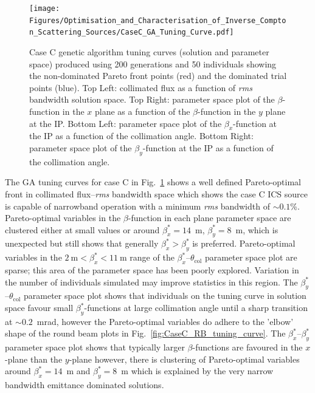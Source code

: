 \documentclass[../main.tex]{subfiles}
\begin{document}
\begin{figure}[!h]
\centering
\texttt{[image: Figures/Optimisation\_and\_Characterisation\_of\_Inverse\_Compton\_Scattering\_Sources/CaseC\_GA\_Tuning\_Curve.pdf]}
\caption{Case C genetic algorithm tuning curves (solution and parameter space) produced using 200 generations and 50 individuals showing the non-dominated Pareto front points (red) and the dominated trial points (blue). Top Left: collimated flux as a function of \textit{rms} bandwidth solution space. Top Right: parameter space plot of the $\beta$-function in the $x$ plane as a function of the $\beta$-function in the $y$ plane at the IP. Bottom Left: parameter space plot of the $\beta_{x}$-function at the IP as a function of the collimation angle. Bottom Right: parameter space plot of the $\beta_{y}$-function at the IP as a function of the collimation angle.}
\label{fig:case_C_GA_tuning_curves}
\end{figure}

The GA tuning curves for case C in Fig.~\ref{fig:case_C_GA_tuning_curves} shows a well defined Pareto-optimal front in collimated flux--\textit{rms} bandwidth space which shows the case C ICS source is capable of narrowband operation with a minimum \textit{rms} bandwidth of $\sim0.1$\%. Pareto-optimal variables in the $\beta$-function in each plane parameter space are clustered either at small values or around $\beta_{x}^{*} = 14$~\si{\meter}, $\beta_{y}^{*} = 8$~\si{\meter}, which is unexpected but still shows that generally $\beta_{x}^{*}>\beta_{y}^{*}$ is preferred. Pareto-optimal variables in the $2\mathrm{~\si{\meter}} < \beta_{x}^{*} < 11\mathrm{~\si{\meter}}$ range of the $\beta_{x}^{*}$--$\theta_{\mathrm{col}}$ parameter space plot are sparse; this area of the parameter space has been poorly explored. Variation in the number of individuals simulated may improve statistics in this region. The $\beta_{y}^{*}$--$\theta_{\mathrm{col}}$ parameter space plot shows that individuals on the tuning curve in solution space favour small $\beta_{y}^{*}$-functions at large collimation angle until a sharp transition at $\sim0.2$~\si{\milli\radian}, however the Pareto-optimal variables do adhere to the 'elbow' shape of the round beam plots in Fig.~\ref{fig:CaseC_RB_tuning_curve}. The $\beta_{x}^{*}$--$\beta_{y}^{*}$ parameter space plot shows that typically larger $\beta$-functions are favoured in the $x$-plane than the $y$-plane however, there is clustering of Pareto-optimal variables around $\beta_{x}^{*} = 14$~\si{\meter} and $\beta_{y}^{*} = 8$~\si{\meter} which is explained by the very narrow bandwidth emittance dominated solutions.
\end{document}
